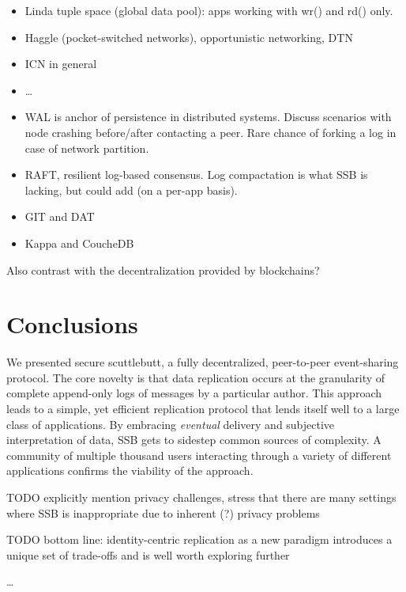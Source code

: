 \documentclass[sigconf]{acmart}
\begin{document}
\begin{itemize}
\item Linda tuple space (global data pool): apps working with wr() and rd() only.
\item Haggle (pocket-switched networks), opportunistic networking, DTN
\item ICN in general
\item \ldots
\item WAL is anchor of persistence in distributed systems. Discuss scenarios with node crashing before/after contacting a peer. Rare chance of forking a log in case of network partition.
\item RAFT, resilient log-based consensus. Log compactation is what SSB is lacking, but could add (on a per-app basis).
\item GIT and DAT
\item Kappa and CoucheDB
\end{itemize}

Also contrast with the decentralization provided by blockchains?

\section{Conclusions}

We presented secure scuttlebutt, a fully decentralized, peer-to-peer event-sharing protocol. The core novelty is that data replication occurs at the granularity of complete append-only logs of messages by a particular author. This approach leads to a simple, yet efficient replication protocol that lends itself well to a large class of applications. By embracing \textit{eventual} delivery and subjective interpretation of data, SSB gets to sidestep common sources of complexity. A community of multiple thousand users interacting through a variety of different applications confirms the viability of the approach.

TODO explicitly mention privacy challenges, stress that there are many settings where SSB is inappropriate due to inherent (?) privacy problems

TODO bottom line: identity-centric replication as a new paradigm introduces a unique set of trade-offs and is well worth exploring further

\ldots




\end{document}
